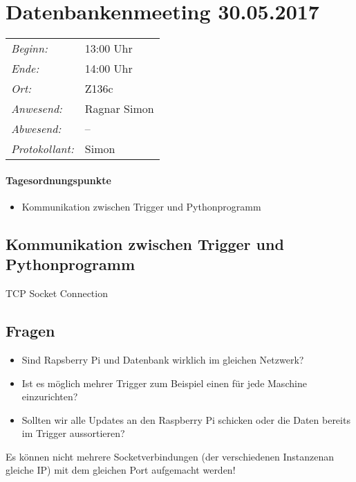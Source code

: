 \documentclass{scrartcl}
\date{30.05.2017}	%
\begin{document}
\maketitle
\section{Datenbankenmeeting 30.05.2017}	%
\begin{tabular}[t]{p{.25\linewidth} p{.25\linewidth}}
\emph{Beginn:}				& 13:00 Uhr\\
\emph{Ende:}					& 14:00 Uhr\\
\emph{Ort:}						& Z136c\\
\emph{Anwesend:}	& 
Ragnar\newline
Simon
\\
\emph{Abwesend:}		 & 
--
\\
\emph{Protokollant:}& Simon
\end{tabular}
\paragraph{Tagesordnungspunkte}
\begin{itemize}
\item Kommunikation zwischen Trigger und Pythonprogramm
\end{itemize}

\subsection{Kommunikation zwischen Trigger und Pythonprogramm}
TCP Socket Connection

\subsection{Fragen}
\begin{itemize}
	\item Sind Rapsberry Pi und Datenbank wirklich im gleichen Netzwerk?
	\item Ist es möglich mehrer Trigger zum Beispiel einen für jede Maschine einzurichten?
	\item Sollten wir alle Updates an den Raspberry Pi schicken oder die Daten bereits im Trigger aussortieren?
\end{itemize}
Es können nicht mehrere Socketverbindungen (der verschiedenen Instanzenan gleiche IP) mit dem gleichen Port aufgemacht werden!
\end{document}

